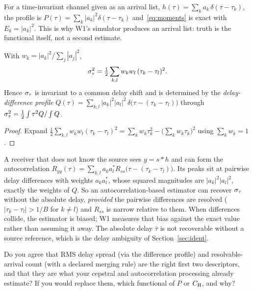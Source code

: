 For a time-invariant channel given as an arrival list, $h(\tau)=\sum_k a_k\,\delta(\tau-\tau_k)$, the profile is $P(\tau)=\sum_k |a_k|^2\delta(\tau-\tau_k)$ and~\eqref{eq:moments} is exact with $E_k=|a_k|^2$. This is why W1's simulator produces an arrival list: truth is the functional itself, not a second estimate.

\begin{proposition}
\label{prop:pairwise}
With $w_k=|a_k|^2/\sum_j|a_j|^2$,
\begin{equation}
  \sigma_{\tau}^2 = \tfrac12 \sum_{k,l} w_k w_l\,(\tau_k-\tau_l)^2 .
  \label{eq:pairwise}
\end{equation}
Hence $\sigma_{\tau}$ is invariant to a common delay shift and is determined by the \emph{delay-difference profile} $Q(\tau)=\sum_{k,l}|a_k|^2|a_l|^2\,\delta\big(\tau-(\tau_k-\tau_l)\big)$ through $\sigma_{\tau}^2 = \tfrac12\int\tau^2Q/\int Q$.
\end{proposition}
\begin{proof}
Expand $\tfrac12\sum_{k,l}w_kw_l(\tau_k-\tau_l)^2=\sum_k w_k\tau_k^2-\big(\sum_k w_k\tau_k\big)^2$ using $\sum_k w_k=1$.
\end{proof}

\begin{remark}
A receiver that does not know the source sees $y=s*h$ and can form the autocorrelation $R_{yy}(\tau)=\sum_{k,l}a_ka_l^\ast R_{ss}\big(\tau-(\tau_k-\tau_l)\big)$. Its peaks sit at pairwise delay differences with weights $a_ka_l^\ast$, whose squared magnitudes are $|a_k|^2|a_l|^2$, exactly the weights of $Q$. So an autocorrelation-based estimator can recover $\sigma_{\tau}$ without the absolute delay, \emph{provided} the pairwise differences are resolved ($|\tau_k-\tau_l|>1/B$ for $k\neq l$) and $R_{ss}$ is narrow relative to them. When differences collide, the estimator is biased; W1 measures that bias against the exact value rather than assuming it away. The absolute delay $\bar\tau$ is not recoverable without a source reference, which is the delay ambiguity of Section~\ref{sec:ident}.
\end{remark}

\begin{question}
Do you agree that RMS delay spread (via the difference profile) and resolvable-arrival count (with a declared merging rule) are the right first two descriptors, and that they are what your cepstral and autocorrelation processing already estimate? If you would replace them, which functional of $P$ or $C_{\mathrm{H}}$, and why?
\end{question}

